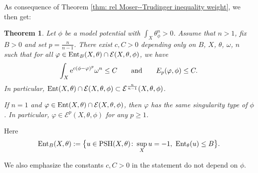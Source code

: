 \documentclass[pdftex]{sigma}
\numberwithin{equation}{section}
\newtheorem{Theorem}{Theorem}[section]
\theoremstyle{plain}
\newcommand \psh {{\rm PSH}}
\newcommand \Ent{{\rm Ent}}
\begin{document}
As consequence of Theorem \ref{thm: rel Moser--Trudinger inequality weight}, we then get:

\begin{Theorem}	\label{thm: Entropy implies rel Ep}
Let $\phi$ be a model potential with $\int_X \theta_\phi^n>0$. Assume that $n > 1$,	
 fix $B>0$ and set $p=\frac{n}{n-1}$.
	There exist $c,C>0$ depending only on $B$, $X$, $\theta$, $\omega$, $n$ such that for all $\varphi\in \Ent_B(X,\theta) \cap\mathcal{E}(X,\theta,\phi)$, we have
\[
	\int_X {\rm e}^{c (\phi-\varphi)^p} \omega^n \leq C \qquad \text{and} \qquad E_p(\varphi, \phi) \leq C.
\]
	In particular, $\Ent(X,\theta) \cap\mathcal{E}(X,\theta,\phi) \subset \mathcal{E}^{\frac{n}{n-1}}(X,\theta, \phi)$.

If $n=1$ and $ \varphi\in \Ent(X,\theta) \cap\mathcal{E}(X,\theta,\phi)$, then $\varphi$ has the same singularity type of $\phi$. In particular, $\varphi\in \mathcal{E}^{p}(X,\theta, \phi)$ for any $p\geq 1$.
 \end{Theorem}

 Here
\[
\Ent_B(X,\theta) := \bigl\{u \in \psh(X, \theta)\colon \sup_X u =-1, \ \Ent_\theta(u) \leq B \bigr\}.
\]

We also emphasize the constants $c, C>0$ in the statement do not depend on $\phi$.
\end{document}
